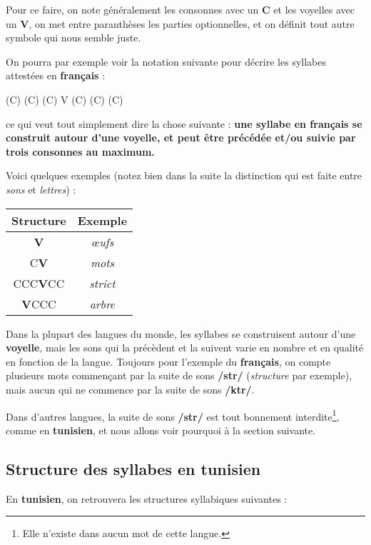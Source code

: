 Pour ce faire, on note généralement les consonnes avec un \textbf{C} et les voyelles avec un \textbf{V}, on met entre paranthèses les parties optionnelles, et on définit tout autre symbole qui nous semble juste. 

On pourra par exemple voir la notation suivante pour décrire les syllabes attestées en \textbf{français} : 

\begin{center}
    {\LARGE (C) (C) (C) V (C) (C) (C)}
\end{center}

ce qui veut tout simplement dire la chose suivante : \textbf{une syllabe en français se construit autour d'une voyelle, et peut être précédée et/ou suivie par trois consonnes au maximum.}

Voici quelques exemples (notez bien dans la suite la distinction qui est faite entre \textit{sons} et \textit{lettres}) : 

\begin{center}
    \begin{tabular}{||c | c||}
        \hline
        \textbf{Structure} & \textbf{Exemple} \\ \hline \hline
        \textbf{V} & \textit{\oe ufs} \\ \hline
        C\textbf{V} & \textit{mots} \\ \hline
        CCC\textbf{V}CC & \textit{strict} \\ \hline
        \textbf{V}CCC & \textit{arbre} \\ \hline
    \end{tabular}
\end{center}

Dans la plupart des langues du monde, les syllabes se construisent autour d'une \textbf{voyelle}, mais les sons qui la précèdent et la suivent varie en nombre et en qualité en fonction de la langue. Toujours pour l'exemple du \textbf{français}, on compte plusieurs mots commençant par la suite de sons \textbf{/str/} (\textit{structure} par exemple), mais aucun qui ne commence par la suite de sons \textbf{/ktr/}.

Dans d'autres langues, la suite de sons \textbf{/str/} est tout bonnement interdite\footnote{Elle n'existe dans aucun mot de cette langue.}, comme en \textbf{tunisien}, et nous allons voir pourquoi à la section suivante.

\subsection{Structure des syllabes en tunisien}
En \textbf{tunisien}, on retrouvera les structures syllabiques suivantes : 

